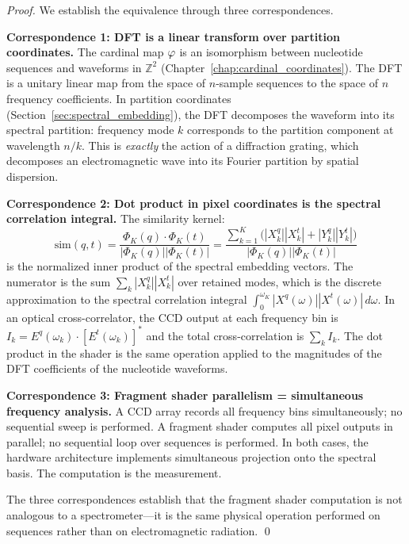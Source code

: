 \begin{proof}
We establish the equivalence through three correspondences.

\medskip
\noindent\textbf{Correspondence 1: DFT is a linear transform over partition coordinates.}
The cardinal map $\varphi$ is an isomorphism between nucleotide sequences
and waveforms in $\mathbb{Z}^2$ (Chapter~\ref{chap:cardinal_coordinates}).
The DFT is a unitary linear map from the space of $n$-sample sequences to the
space of $n$ frequency coefficients. In partition coordinates (Section~\ref{sec:spectral_embedding}),
the DFT decomposes the waveform into its spectral partition: frequency mode $k$
corresponds to the partition component at wavelength $n/k$. This is
\emph{exactly} the action of a diffraction grating, which decomposes an
electromagnetic wave into its Fourier partition by spatial dispersion.

\medskip
\noindent\textbf{Correspondence 2: Dot product in pixel coordinates is the
spectral correlation integral.}
The similarity kernel:
\begin{equation}
  \mathrm{sim}(q, t) = \frac{\Phi_K(q) \cdot \Phi_K(t)}{|\Phi_K(q)||\Phi_K(t)|}
  = \frac{\sum_{k=1}^{K}\bigl(|X_k^q||X_k^t| + |Y_k^q||Y_k^t|\bigr)}{|\Phi_K(q)||\Phi_K(t)|}
  \label{eq:cosine_sim}
\end{equation}
is the normalized inner product of the spectral embedding vectors. The
numerator is the sum $\sum_k |X_k^q||X_k^t|$ over retained modes, which is
the discrete approximation to the spectral correlation integral
$\int_0^{\omega_K} |X^q(\omega)||X^t(\omega)|\,d\omega$.
In an optical cross-correlator, the CCD output at each frequency bin is
$I_k = E^q(\omega_k) \cdot [E^t(\omega_k)]^*$ and the total cross-correlation is
$\sum_k I_k$. The dot product in the shader is the same operation applied to the
magnitudes of the DFT coefficients of the nucleotide waveforms.

\medskip
\noindent\textbf{Correspondence 3: Fragment shader parallelism = simultaneous
frequency analysis.}
A CCD array records all frequency bins simultaneously; no sequential sweep
is performed. A fragment shader computes all pixel outputs in parallel; no
sequential loop over sequences is performed. In both cases, the hardware
architecture implements simultaneous projection onto the spectral basis.
The computation is the measurement.

The three correspondences establish that the fragment shader computation is
not analogous to a spectrometer---it is the same physical operation performed
on sequences rather than on electromagnetic radiation. \qed
\end{proof}


